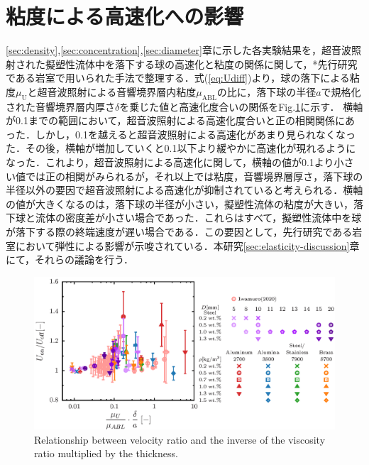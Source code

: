 \section{粘度による高速化への影響}
\label{sec:viscosity}
\ref{sec:density},\ref{sec:concentration},\ref{sec:diameter}章に示した各実験結果を，超音波照射された擬塑性流体中を落下する球の高速化と粘度の関係に関して，*先行研究である岩室\cite{ref:8}で用いられた手法で整理する．式(\ref{eq:Udiff})より，球の落下による粘度$\mu_\text{U}$と超音波照射による音響境界層内粘度$\mu_\text{ABL}$の比に，落下球の半径$a$で規格化された音響境界層内厚さ$\delta$を乗じた値と高速化度合いの関係をFig.\ref{fig:viscosity_ratio}に示す．
横軸が0.1までの範囲において，超音波照射による高速化度合いと正の相関関係にあった．しかし，0.1を越えると超音波照射による高速化があまり見られなくなった．その後，横軸が増加していくと0.1以下より緩やかに高速化が現れるようになった．これより，超音波照射による高速化に関して，横軸の値が0.1より小さい値では正の相関がみられるが，それ以上では粘度，音響境界層厚さ，落下球の半径以外の要因で超音波照射による高速化が抑制されていると考えられる．横軸の値が大きくなるのは，落下球の半径が小さい，擬塑性流体の粘度が大きい，落下球と流体の密度差が小さい場合であった．これらはすべて，擬塑性流体中を球が落下する際の終端速度が遅い場合である．この要因として，先行研究である岩室\cite{ref:8}において弾性による影響が示唆されている．本研究\ref{sec:elasticity-discussion}章にて，それらの議論を行う．

\begin{figure}[ht]
    \centering
    \includegraphics[width=1.0\textwidth]{5-Results/viscosity.eps}
    \caption{Relationship between velocity ratio and the inverse of the viscosity ratio multiplied by the thickness.}
    \label{fig:viscosity_ratio}
\end{figure}
